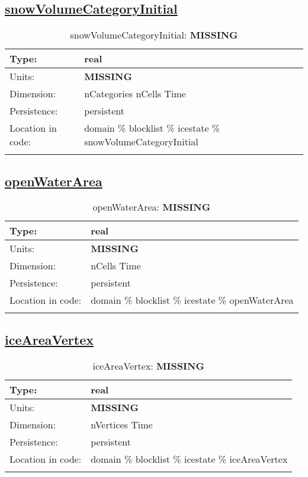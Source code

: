 \subsection[snowVolumeCategoryInitial]{\hyperref[sec:var_tab_icestate]{snowVolumeCategoryInitial}}
\label{subsec:var_sec_icestate_snowVolumeCategoryInitial}
\begin{center}
\begin{longtable}{| p{2.0in} | p{4.0in} |}
        \hline 
        Type: & real \\
        \hline 
        Units: & {\bf \color{red} MISSING} \\
        \hline 
        Dimension: & nCategories nCells Time \\
        \hline 
        Persistence: & persistent \\
        \hline 
         Location in code: & domain \% blocklist \% icestate \% snowVolumeCategoryInitial \\
         \hline 
    \caption{snowVolumeCategoryInitial: {\bf \color{red} MISSING}}
\end{longtable}
\end{center}
\subsection[openWaterArea]{\hyperref[sec:var_tab_icestate]{openWaterArea}}
\label{subsec:var_sec_icestate_openWaterArea}
\begin{center}
\begin{longtable}{| p{2.0in} | p{4.0in} |}
        \hline 
        Type: & real \\
        \hline 
        Units: & {\bf \color{red} MISSING} \\
        \hline 
        Dimension: & nCells Time \\
        \hline 
        Persistence: & persistent \\
        \hline 
         Location in code: & domain \% blocklist \% icestate \% openWaterArea \\
         \hline 
    \caption{openWaterArea: {\bf \color{red} MISSING}}
\end{longtable}
\end{center}
\subsection[iceAreaVertex]{\hyperref[sec:var_tab_icestate]{iceAreaVertex}}
\label{subsec:var_sec_icestate_iceAreaVertex}
\begin{center}
\begin{longtable}{| p{2.0in} | p{4.0in} |}
        \hline 
        Type: & real \\
        \hline 
        Units: & {\bf \color{red} MISSING} \\
        \hline 
        Dimension: & nVertices Time \\
        \hline 
        Persistence: & persistent \\
        \hline 
         Location in code: & domain \% blocklist \% icestate \% iceAreaVertex \\
         \hline 
    \caption{iceAreaVertex: {\bf \color{red} MISSING}}
\end{longtable}
\end{center}

